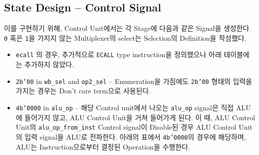 \documentclass{scrartcl}
\begin{document}
\subsection{State Design -- Control Signal}
이를 구현하기 위해, Control Unit에서는 각 Stage에 다음과 같은 Signal을 생성한다. \texttt{0} 혹은 \texttt{1}을 가지지 않는
Multiplexer의 select는 Selection의 Definition을 작성했다.
\begin{itemize}
  \item \texttt{ecall} 의 경우, 추가적으로 \texttt{ECALL} type instruction을 정의했으나 아래 테이블에는 추가하지 않았다.
  \item \texttt{2b'00} in \texttt{wb\_sel} and \texttt{op2\_sel} -- Enumeration을 가짐에도 \texttt{2b'00} 형태의
  입력을 가지는 경우는 Don't care term으로 사용된다.
  \item \texttt{4b'0000} in \texttt{alu\_op} -- 해당 Control unit에서 나오는 \texttt{alu\_op} signal은 직접 ALU에 들어가지 않고,
  ALU Control Unit을 거쳐 들어가게 된다. 이 때, ALU Control Unit의 \texttt{alu\_op\_from\_inst} Control signal이 Disable된 경우
  ALU Control Unit의 입력 signal을 ALU로 전파한다. 아래의 표에서 \texttt{4b'0000}의 경우에 해당하며, ALU는 Instruction으로부터 결정된 Operation을 수행한다.
\end{itemize}
\end{document}
